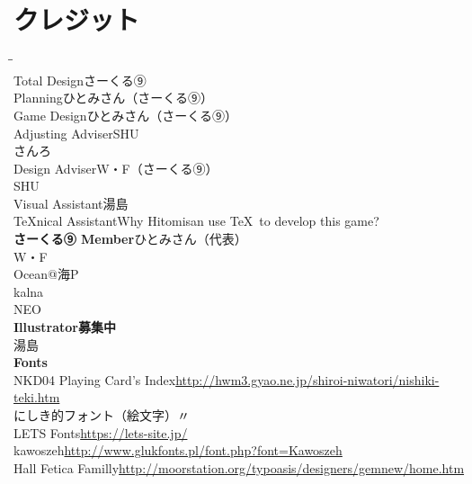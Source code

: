 \documentclass[line_length=22zw,number_of_lines=45,twocolumn]{jlreq}
\newcommand{\hmemph}[1]{\textbf{#1}}
\begin{document}
\onecolumn
\section{クレジット}
\begin{tabbing}
	\hspace{15\zw}\=\hspace{15\zw}\=\kill\\
	Total Design\>さーくる⑨\\
	Planning\>ひとみさん（さーくる⑨）\\
	Game Design\>ひとみさん（さーくる⑨）\\
	Adjusting Adviser\>SHU\\
	\>さんろ\\
	Design Adviser\>W・F（さーくる⑨）\\
	\>SHU\\
	Visual Assistant\>湯島\\
	\TeX nical Assistant\>Why Hitomisan use \TeX\ to develop this game?\\
	\hmemph{さーくる⑨ Member}\>ひとみさん（代表）\\
	\>W・F\\
	\>Ocean@海P\\
	\>kalna\\
	\>NEO\\
	\hmemph{Illustrator}\>\hmemph{募集中}\\
	湯島\\
	\hmemph{Fonts}\\
	NKD04 Playing Card's Index\>\url{http://hwm3.gyao.ne.jp/shiroi-niwatori/nishiki-teki.htm}\\
	にしき的フォント（絵文字）\>〃\\
	LETS Fonts\>\url{https://lets-site.jp/}\\
	kawoszeh\>\url{http://www.glukfonts.pl/font.php?font=Kawoszeh}\\
	Hall Fetica Familly\>\url{http://moorstation.org/typoasis/designers/gemnew/home.htm}
\end{tabbing}

\doclicenseThis
\end{document}
